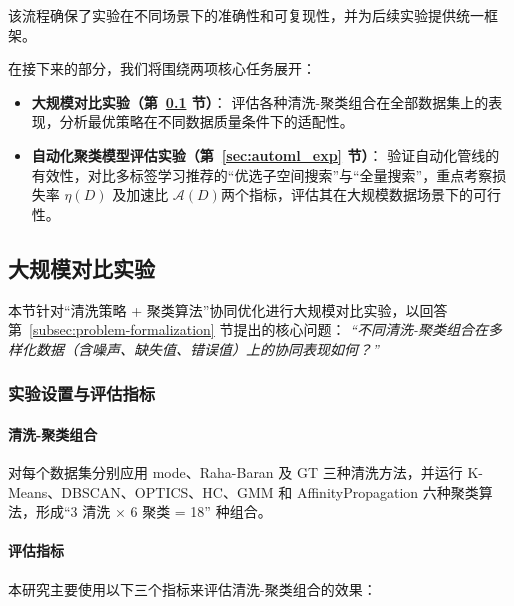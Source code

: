 \documentclass[10pt]{article} %
\numberwithin{equation}{section}
\begin{document}
该流程确保了实验在不同场景下的准确性和可复现性，并为后续实验提供统一框架。

在接下来的部分，我们将围绕两项核心任务展开：
\begin{itemize}
    \item \textbf{大规模对比实验（第~\ref{sec:large_scale_exp} 节）}：  
    评估各种清洗-聚类组合在全部数据集上的表现，分析最优策略在不同数据质量条件下的适配性。

    \item \textbf{自动化聚类模型评估实验（第~\ref{sec:automl_exp} 节）}：  
    验证自动化管线的有效性，对比多标签学习推荐的“优选子空间搜索”与“全量搜索”，重点考察损失率 \(\eta(D)\) 及加速比 \(\mathcal{A}(D)\)两个指标，评估其在大规模数据场景下的可行性。
\end{itemize}

\subsection{大规模对比实验}
\label{sec:large_scale_exp}

本节针对“清洗策略 + 聚类算法”协同优化进行大规模对比实验，以回答第~\ref{subsec:problem-formalization} 节提出的核心问题：
\emph{“不同清洗-聚类组合在多样化数据（含噪声、缺失值、错误值）上的协同表现如何？”}

\subsubsection{实验设置与评估指标}
\label{sec:exp_setting_largeset}

\paragraph{清洗-聚类组合}
对每个数据集分别应用 mode、Raha-Baran 及 GT 三种清洗方法，并运行 K-Means、DBSCAN、OPTICS、HC、GMM 和 AffinityPropagation 六种聚类算法，形成“3 清洗 × 6 聚类 = 18” 种组合。

\paragraph{评估指标}
本研究主要使用以下三个指标来评估清洗-聚类组合的效果：
\end{document}
